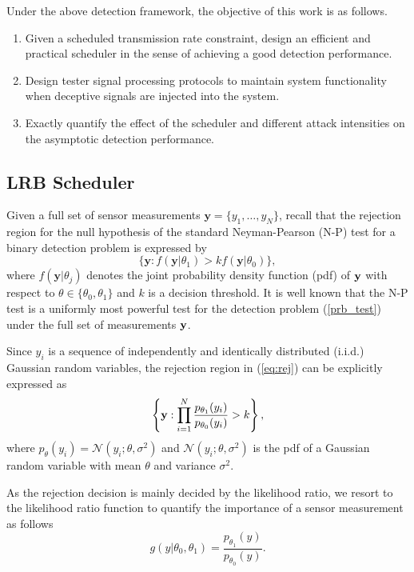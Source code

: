 \documentclass[journal]{IEEEtran}
\begin{document}
Under the above detection framework, the objective of this work is as follows.
\begin{enumerate}
 \item Given a scheduled transmission rate constraint, design an efficient and practical scheduler in the sense of achieving a good detection performance.
 \item Design tester signal processing protocols to maintain system functionality when deceptive signals are injected into the system.
\item  Exactly quantify the effect of the scheduler and different attack intensities on the asymptotic detection performance.
\end{enumerate}



\subsection{LRB Scheduler}
Given a full set of sensor measurements $\mathbf{y}=\{y_{1},\ldots,y_{N}\}$,  recall that the rejection region for the null hypothesis of the standard Neyman-Pearson (N-P) test for a binary detection problem is expressed by
\begin{equation}
\{\mathbf{y}:f(\mathbf{y}|\theta_{1})>kf(\mathbf{y}|\theta_{0})\},\label{eq:rej}
\end{equation}
where  $f(\mathbf{y}|\theta_{j})$ denotes the joint probability density function (pdf) of ${\bf y}$ with respect to $\theta\in\{\theta_0, \theta_1\}$ and $k$ is a decision threshold. It is well known that
the N-P test is a uniformly most powerful test for the detection problem (\ref{prb_test}) under the full set of measurements ${\bf y}$.

Since ${y}_i$ is a sequence of independently and identically distributed (i.i.d.) Gaussian random variables,
the rejection region in (\ref{eq:rej}) can be explicitly expressed as
\begin{equation}\label{rejection}\left\{ {{\bf{y}}:\prod\limits_{i = 1}^N {\frac{{{p_{{\theta _1}}}({y_i})}}{{{p_{{\theta _0}}}({y_i})}}}  > k} \right\},
\end{equation}
where $p_{\theta}(y_{i})=\mathcal{N}(y_{i};\theta,\sigma^{2})$ and $\mathcal{N}(y_{i};\theta,\sigma^{2})$ is the pdf of a Gaussian random variable with mean $\theta$ and variance $\sigma^{2}$.

As the rejection decision is mainly decided by the likelihood ratio, we resort to the likelihood ratio function to quantify the importance of a sensor measurement as follows
\begin{equation}
g(y|\theta_{0},\theta_{1})=\frac{p_{\theta_{1}}(y)}{p_{\theta_{0}}(y)}.
\end{equation}
\end{document}
